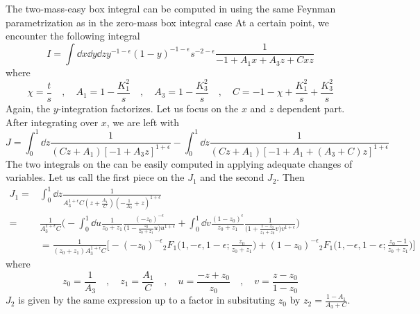 The two-mass-easy box integral can be computed in using the same Feynman parametrization as in the zero-mass box integral case
At a certain point, we encounter the following integral
\begin{equation*}
I = \int\dd x\dd y \dd z y^{-1-\epsilon}(1-y)^{-1-\epsilon}s^{-2-\epsilon}
\frac{1}{-1 + A_1 x + A_3 z + C xz}
\end{equation*}
where
\begin{equation*}
\chi = \frac{t}{s}\quad, \quad
A_1 = 1 - \frac{K_1^2}{s}\quad, \quad
A_3 = 1 - \frac{K_3^2}{s} \quad,\quad
C = -1 - \chi  + \frac{K_1^2}{s} + \frac{K_3^2}{s}
\end{equation*}
Again, the $y$-integration factorizes. Let us focus on the $x$ and $z$ dependent part.
After integrating over $x$, we are left with 
\begin{equation*}
J = \int^1_0\dd z\frac{1}{(Cz + A_1)[-1 + A_3z]^{1+\epsilon}} - 
\int^1_0\dd z\frac{1}{(Cz + A_1)[-1 + A_1  + (A_3 + C)z]^{1+\epsilon} }
\end{equation*}
The two integrals on the \rhs can be easily computed in applying adequate changes of variables.
Let us call the first piece on the \rhs $J_1$ and the second $J_2$.
Then
\begin{equation*}
\begin{split}
J_1 = & \int^1_0 \dd z \frac{1}{A_3^{1+\epsilon}C(z + \frac{A_1}{C})(-\frac{1}{A_3} + z)^{1+\epsilon}} 
\\
= &
\frac{1}{A_3^{1+\epsilon}C}\Big(
-\int^1_0 \dd u \frac{1}{z_0 + z_1}\frac{(-z_0)^{-\epsilon}}{\big(1-\frac{z_0}{z_0 + z_1}u\big) u^{1+\epsilon}} +
\int^1_0\dd v \frac{(1-z_0)^{\epsilon}}{z_0 + z_1}\frac{1}{\big(1+ \frac{1-z_0}{z_1 + z_0}v\big)v^{1+\epsilon}}\Big)
\\
& = 
\frac{1}{(z_0 + z_1 )A_3^{1+\epsilon}C}
\Big[-(-z_0)^{-\epsilon}{}_2F_1\big(1,-\epsilon, 1-\epsilon; \frac{z_0}{z_0 + z_1}\big)
+ (1-z_0)^{-\epsilon}{}_2F_1\big(1, -\epsilon, 1-\epsilon; \frac{z_0 -1}{z_0 + z_1}\big)\Big]
\end{split}
\end{equation*}
where
\begin{equation*}
z_0 = \frac{1}{A_3} \quad, \quad z_1 = \frac{A_1}{C}
\quad,\quad
u=\frac{-z + z_0}{z_0}\quad,\quad
v=\frac{z-z_0}{1-z_0}
\end{equation*}
$J_2$ is given by the same expression up to a factor in subsituting $z_0$ by $z_2 = \frac{1 - A_1}{A_3 + C}$. 
%
%
%
\iffalse %
